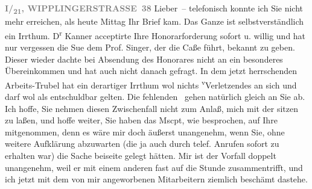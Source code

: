 \pstart
           \textcolor{gray}{\textbf{I/\textsubscript{21},
                           WIPPLINGERSTRASSE 38}}\pend
           \vspace{0.5em}
\pstart
           Lieber – telefonisch konnte ich Sie nicht mehr erreichen, als heute{ }Mittag Ihr Brief kam. Das Ganze ist selbstverständlich ein Irrthum. D\textsuperscript{r}{ }Kanner acceptirte \label{K_L03333-1v}\label{K_L03333-1} Ihre Honorarforderung sofort u. willig und hat nur vergessen die Su{\geminationm}e dem Prof. Singer, der die Caße führt, bekannt zu geben. Dieser wieder dachte bei
               Absendung des Honorares nicht an ein besonderes Übereinkommen und hat auch nicht
               danach gefragt. In dem jetzt herrschenden Arbeits-Trubel hat ein derartiger Irrthum
               wol nichts \substVorne{}\textsuperscript{v}\substDazwischen{}V\substHinten{}erletzendes an sich und darf wol als entschuldbar gelten. Die
               fehlenden \label{K_L03333-2v}\label{K_L03333-2} gehen natürlich gleich an Sie ab. Ich hoffe, Sie nehmen diesen
               Zwischenfall nicht zum Anlaß, mich mit der \label{K_L03333-3v}\label{K_L03333-3} sitzen zu laßen, und hoffe weiter, Sie haben das Mscpt, wie besprochen, auf Ihre
                  \label{K_L03333-4v}\label{K_L03333-4} mitgenommen, denn
               es wäre mir doch äußerst unangenehm, wenn Sie, ohne weitere Aufklärung abzuwarten
               (die ja auch durch telef. Anrufen sofort zu erhalten war) die Sache beiseite gelegt
               hätten. Mir ist der Vorfall doppelt unangenehm, weil er mit einem anderen fast auf
               die Stunde zusammentrifft, und ich jetzt mit dem von mir angeworbenen Mitarbeitern
               ziemlich beschämt dastehe.\pend
           
